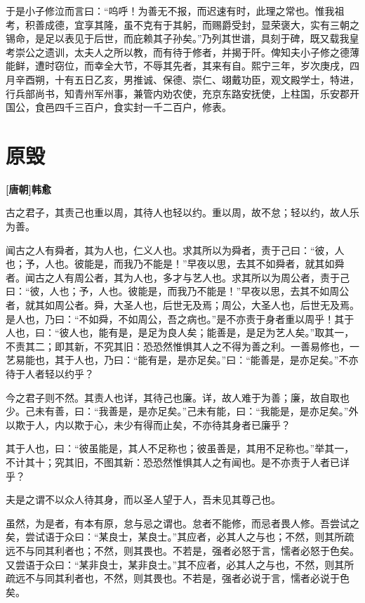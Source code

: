 \documentclass[UTF8,titlepage,oneside]{ctexbook}
\begin{document}
于是小子修泣而言曰：“呜呼！为善无不报，而迟速有时，此理之常也。惟我祖考，积善成德，宜享其隆，虽不克有于其躬，而赐爵受封，显荣褒大，实有三朝之锡命，是足以表见于后世，而庇赖其子孙矣。”乃列其世谱，具刻于碑，既又载我皇考崇公之遗训，太夫人之所以教，而有待于修者，并揭于阡。俾知夫小子修之德薄能鲜，遭时窃位，而幸全大节，不辱其先者，其来有自。熙宁三年，岁次庚戌，四月辛酉朔，十有五日乙亥，男推诚、保德、崇仁、翊戴功臣，观文殿学士，特进，行兵部尚书，知青州军州事，兼管内劝农使，充京东路安抚使，上柱国，乐安郡开国公，食邑四千三百户，食实封一千二百户，修表。



\chapter*{原毁}
\begin{center}
	\textbf{[唐朝]韩愈}
\end{center}

古之君子，其责己也重以周，其待人也轻以约。重以周，故不怠；轻以约，故人乐为善。

闻古之人有舜者，其为人也，仁义人也。求其所以为舜者，责于己曰：“彼，人也；予，人也。彼能是，而我乃不能是！”早夜以思，去其不如舜者，就其如舜者。闻古之人有周公者，其为人也，多才与艺人也。求其所以为周公者，责于己曰：“彼，人也；予，人也。彼能是，而我乃不能是！”早夜以思，去其不如周公者，就其如周公者。舜，大圣人也，后世无及焉；周公，大圣人也，后世无及焉。是人也，乃曰：“不如舜，不如周公，吾之病也。”是不亦责于身者重以周乎！其于人也，曰：“彼人也，能有是，是足为良人矣；能善是，是足为艺人矣。”取其一，不责其二；即其新，不究其旧：恐恐然惟惧其人之不得为善之利。一善易修也，一艺易能也，其于人也，乃曰：“能有是，是亦足矣。”曰：“能善是，是亦足矣。”不亦待于人者轻以约乎？

今之君子则不然。其责人也详，其待己也廉。详，故人难于为善；廉，故自取也少。己未有善，曰：“我善是，是亦足矣。”己未有能，曰：“我能是，是亦足矣。”外以欺于人，内以欺于心，未少有得而止矣，不亦待其身者已廉乎？

其于人也，曰：“彼虽能是，其人不足称也；彼虽善是，其用不足称也。”举其一，不计其十；究其旧，不图其新：恐恐然惟惧其人之有闻也。是不亦责于人者已详乎？

夫是之谓不以众人待其身，而以圣人望于人，吾未见其尊己也。

虽然，为是者，有本有原，怠与忌之谓也。怠者不能修，而忌者畏人修。吾尝试之矣，尝试语于众曰：“某良士，某良士。”其应者，必其人之与也；不然，则其所疏远不与同其利者也；不然，则其畏也。不若是，强者必怒于言，懦者必怒于色矣。又尝语于众曰：“某非良士，某非良士。”其不应者，必其人之与也，不然，则其所疏远不与同其利者也，不然，则其畏也。不若是，强者必说于言，懦者必说于色矣。
\end{document}
